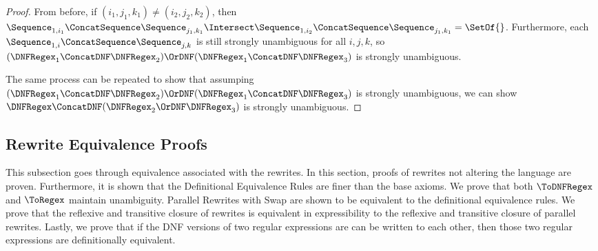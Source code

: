 \documentclass[sigplan,acmsmall]{acmart}
\begin{document}
\begin{proof}
  From before, if $(i_1,j_1,k_1) \neq (i_2,j_2,k_2)$, then
  $\Sequence_{1,i_1} \ConcatSequence \Sequence_{j_1,k_1} \Intersect
  \Sequence_{1,i_2} \ConcatSequence \Sequence_{j_1,k_1} = \SetOf{}$.
  Furthermore, each $\Sequence_{1,i} \ConcatSequence \Sequence_{j,k}$ is still
  strongly unambiguous for all $i,j,k$, so
  $(\DNFRegex_1 \ConcatDNF \DNFRegex_2) \OrDNF
  (\DNFRegex_1 \ConcatDNF \DNFRegex_3)$ is strongly unambiguous.

  The same process can be repeated to show that assumping
  $(\DNFRegex_1 \ConcatDNF \DNFRegex_2) \OrDNF
  (\DNFRegex_1 \ConcatDNF \DNFRegex_3)$ is strongly unambiguous, we can show
  $\DNFRegex \ConcatDNF (\DNFRegex_2 \OrDNF \DNFRegex_3)$ is strongly unambiguous.
\end{proof}


\subsection{Rewrite Equivalence Proofs}
\label{rewrite-proofs}

This subsection goes through equivalence associated with the rewrites.  In this
section, proofs of rewrites not altering the language are proven.  Furthermore,
it is shown that the Definitional Equivalence Rules are finer than the base
axioms.  We prove that both $\ToDNFRegex$ and $\ToRegex$ maintain unambiguity.
Parallel Rewrites with Swap are shown to be equivalent to the definitional
equivalence rules.
We prove that the reflexive and transitive closure of rewrites is equivalent in
expressibility to the reflexive and transitive closure of parallel rewrites.
Lastly, we prove that if the DNF versions of two regular expressions are can be
written to each other, then those two regular expressions are definitionally
equivalent.
\end{document}
